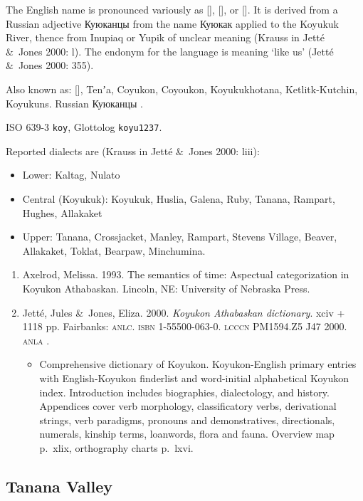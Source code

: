 \documentclass[12pt,letterpaper,oneside,article]{memoir}
\begin{document}
The English name  is pronounced variously as  [], [], or [].
It is derived from a Russian adjective Куюканцы  from the name Куюкак  applied to the Koyukuk River, thence from Inupiaq  or Yupik  of unclear meaning (Krauss in Jetté \&\ Jones 2000: l).
The endonym for the language is  meaning ‘like us’ (Jetté \&\ Jones 2000: 355).

Also known as:  [], Tenʼa, Coyukon, Coyoukon, Koyukukhotana, Ketlitk-Kutchin, Koyukuns.
Russian Куюканцы .

ISO 639-3 \texttt{koy}, Glottolog \texttt{koyu1237}.

Reported dialects are (Krauss in Jetté \&\ Jones 2000: liii):
\begin{itemize}
\item	Lower: Kaltag, Nulato
\item	Central (Koyukuk): Koyukuk, Huslia, Galena, Ruby, Tanana, Rampart, Hughes, Allakaket
\item	Upper: Tanana, Crossjacket, Manley, Rampart, Stevens Village, Beaver,
	Allakaket, Toklat, Bearpaw, Minchumina.
\end{itemize}

\begin{enumerate}
\item	Axelrod, Melissa.
	1993.
	The semantics of time: Aspectual categorization in Koyukon Athabaskan.
	Lincoln, NE: University of Nebraska Press.
\item	Jetté, Jules \&\ Jones, Eliza.
	2000.
	\textit{Koyukon Athabaskan dictionary}.
	xciv + 1118 pp.
	Fairbanks: \textsc{anlc}.
	\textsc{isbn} 1-55500-063-0.
	\textsc{lcccn} PM1594.Z5 J47 2000.
	\textsc{anla} .
	\begin{itemize}
	\item	Comprehensive dictionary of Koyukon.
		Koyukon-English primary entries with English-Koyukon finderlist and
		word-initial alphabetical Koyukon index.
		Introduction includes biographies, dialectology, and history.
		Appendices cover verb morphology, classificatory verbs, derivational
		strings, verb paradigms, pronouns and demonstratives, directionals,
		numerals, kinship terms, loanwords, flora and fauna.
		Overview map p.\ xlix, orthography charts p.\ lxvi.
	\end{itemize}
\end{enumerate}

\subsection{Tanana Valley}\label{sec:dene-alaska-tanana}
\end{document}
